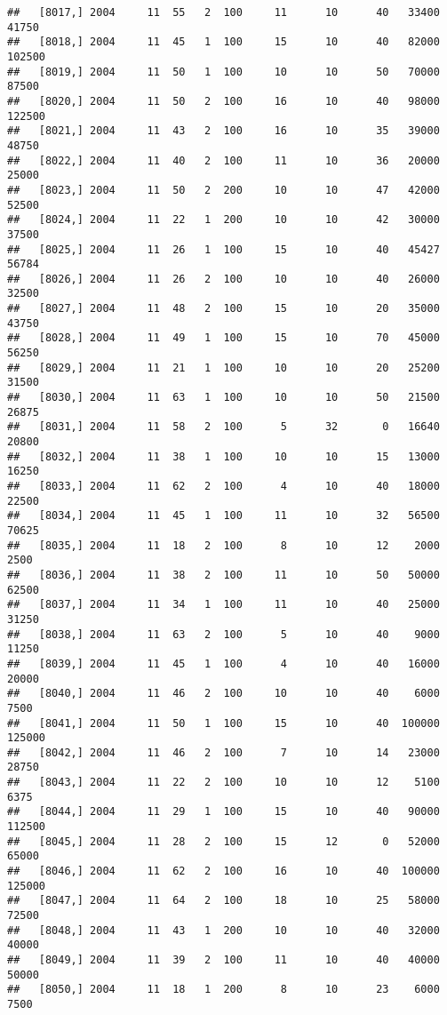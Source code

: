\documentclass{article}\usepackage[]{graphicx}\usepackage[]{color}
\makeatletter
\newenvironment{kframe}{%
 \def\at@end@of@kframe{}%
 \ifinner\ifhmode%
  \def\at@end@of@kframe{\end{minipage}}%
  \begin{minipage}{\columnwidth}%
 \fi\fi%
 \def\FrameCommand##1{\hskip\@totalleftmargin \hskip-\fboxsep
 \colorbox{shadecolor}{##1}\hskip-\fboxsep
     \hskip-\linewidth \hskip-\@totalleftmargin \hskip\columnwidth}%
 \MakeFramed {\advance\hsize-\width
   \@totalleftmargin\z@ \linewidth\hsize
   \@setminipage}}%
 {\par\unskip\endMakeFramed%
 \at@end@of@kframe}
\newenvironment{knitrout}{}{} %
\makeatother
\begin{document}
\begin{knitrout}
\begin{kframe}
\begin{verbatim}
##   [8017,] 2004     11  55   2  100     11      10      40   33400   41750
##   [8018,] 2004     11  45   1  100     15      10      40   82000  102500
##   [8019,] 2004     11  50   1  100     10      10      50   70000   87500
##   [8020,] 2004     11  50   2  100     16      10      40   98000  122500
##   [8021,] 2004     11  43   2  100     16      10      35   39000   48750
##   [8022,] 2004     11  40   2  100     11      10      36   20000   25000
##   [8023,] 2004     11  50   2  200     10      10      47   42000   52500
##   [8024,] 2004     11  22   1  200     10      10      42   30000   37500
##   [8025,] 2004     11  26   1  100     15      10      40   45427   56784
##   [8026,] 2004     11  26   2  100     10      10      40   26000   32500
##   [8027,] 2004     11  48   2  100     15      10      20   35000   43750
##   [8028,] 2004     11  49   1  100     15      10      70   45000   56250
##   [8029,] 2004     11  21   1  100     10      10      20   25200   31500
##   [8030,] 2004     11  63   1  100     10      10      50   21500   26875
##   [8031,] 2004     11  58   2  100      5      32       0   16640   20800
##   [8032,] 2004     11  38   1  100     10      10      15   13000   16250
##   [8033,] 2004     11  62   2  100      4      10      40   18000   22500
##   [8034,] 2004     11  45   1  100     11      10      32   56500   70625
##   [8035,] 2004     11  18   2  100      8      10      12    2000    2500
##   [8036,] 2004     11  38   2  100     11      10      50   50000   62500
##   [8037,] 2004     11  34   1  100     11      10      40   25000   31250
##   [8038,] 2004     11  63   2  100      5      10      40    9000   11250
##   [8039,] 2004     11  45   1  100      4      10      40   16000   20000
##   [8040,] 2004     11  46   2  100     10      10      40    6000    7500
##   [8041,] 2004     11  50   1  100     15      10      40  100000  125000
##   [8042,] 2004     11  46   2  100      7      10      14   23000   28750
##   [8043,] 2004     11  22   2  100     10      10      12    5100    6375
##   [8044,] 2004     11  29   1  100     15      10      40   90000  112500
##   [8045,] 2004     11  28   2  100     15      12       0   52000   65000
##   [8046,] 2004     11  62   2  100     16      10      40  100000  125000
##   [8047,] 2004     11  64   2  100     18      10      25   58000   72500
##   [8048,] 2004     11  43   1  200     10      10      40   32000   40000
##   [8049,] 2004     11  39   2  100     11      10      40   40000   50000
##   [8050,] 2004     11  18   1  200      8      10      23    6000    7500

\end{verbatim}
\end{kframe}
\end{knitrout}
\end{document}
